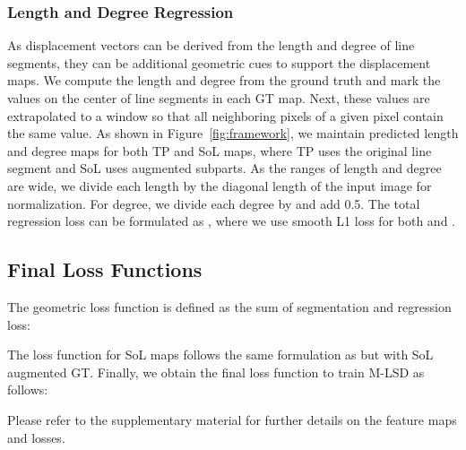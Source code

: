 \documentclass[letterpaper]{article} \usepackage{aaai22}  \usepackage{times}  \usepackage{helvet}  \usepackage{courier}  \usepackage[hyphens]{url}  \usepackage{graphicx} \urlstyle{rm} \def\UrlFont{\rm}  \usepackage{natbib}  \usepackage{caption} \DeclareCaptionStyle{ruled}{labelfont=normalfont,labelsep=colon,strut=off} \frenchspacing  \setlength{\pdfpagewidth}{8.5in}  \setlength{\pdfpageheight}{11in}  \usepackage{algorithm}
\begin{document}
\subsubsection{Length and Degree Regression}
As displacement vectors can be derived from the length and degree of line segments, they can be additional geometric cues to support the displacement maps.
We compute the length and degree from the ground truth and mark the values on the center of line segments in each GT map.
Next, these values are extrapolated to a  window so that all neighboring pixels of a given pixel contain the same value.
As shown in Figure~\ref{fig:framework}, we maintain predicted length and degree maps for both TP and SoL maps, where TP uses the original line segment and SoL uses augmented subparts.
As the ranges of length and degree are wide, we divide each length by the diagonal length of the input image for normalization.
For degree, we divide each degree by  and add 0.5.
The total regression loss can be formulated as , where we use smooth L1 loss for both  and .

\begin{comment}


\end{comment}

\subsection{Final Loss Functions}
The geometric loss function is defined as the sum of segmentation and regression loss:

The loss function for SoL maps  follows the same formulation as  but with SoL augmented GT.
Finally, we obtain the final loss function to train M-LSD as follows:

Please refer to the supplementary material for further details on the feature maps and losses.

\begin{comment}
The loss function for TP maps  is defined as the sum of center and displacement loss, length and degree regression loss, and a matching loss:

The loss function for SoL maps  follows the same formulation as Equation~\ref{eq:tp} but with SoL augmented GT.
Finally, we obtain the final loss function  as follows:

As illustrated in Figure~\ref{fig:framework},  and  each optimizes the line representation maps and  optimizes the segmentation maps.
\end{comment}
\end{document}
